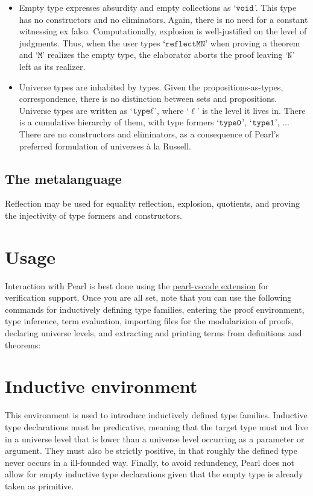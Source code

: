\documentclass[a4paper]{article}
\begin{document}
\begin{itemize}
	\item Empty type expresses absurdity and empty collections as `$\mathtt{void}$'. This type has no constructors and no eliminators. Again, there is no need for a constant witnessing ex falso. Computationally, explosion is well-justified on the level of judgments. Thus, when the user types `$\mathtt{reflect M N}$'  when proving a theorem and `$\mathtt{M}$' realizes the empty type, the elaborator aborts the proof leaving `$\mathtt{N}$' left as its realizer.
	
	\item Universe types are inhabited by types. Given the propositions-as-types, correspondence, there is no distinction between sets and propositions. Universe types are written as `$\mathtt{\mathtt{type} \ell}$', where `$\ell$' is the level it lives in. There is a cumulative hierarchy of them, with type formers `$\mathtt{\mathtt{type} 0}$', `$\mathtt{\mathtt{type} 1}$', ... There are
	no constructors and eliminators, as a consequence of Pearl's preferred
	formulation of universes à la Russell.
\end{itemize}

\subsection{The metalanguage}

Reflection may be used for equality reflection, explosion, quotients, and proving the injectivity of type formers and constructors.

\section{Usage}

Interaction with Pearl is best done using the \href{https://github.com/bbentzen/pearl/tree/main/vscode}{pearl-vscode extension} for verification support. Once you are all set, note that you can use the following commands for inductively defining type families, entering the proof environment, type inference, term evaluation, importing files for the modularizion of proofs, declaring universe levels, and extracting and printing terms from definitions and theorems:

\section{Inductive environment}

This environment is used to introduce inductively defined type families. Inductive type declarations must be predicative, meaning that the target type must not live in a universe level that is lower than a universe level occurring as a parameter or argument. They must also be strictly positive, in that roughly the defined type never occurs in a ill-founded way. Finally, to avoid redundency, Pearl does not allow for empty inductive type declarations given that the empty type is already taken as primitive.
\end{document}
